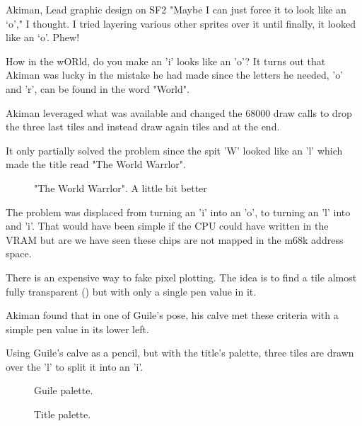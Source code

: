 \begin{q}{Akiman, Lead graphic design on SF2}
"Maybe I can just force it to look like an ‘o’," I thought. I tried layering various other sprites over it until finally, it looked like an ‘o’. Phew!
\end{q}

How in the wORld, do you make an 'i' looks like an 'o'? It turns out that Akiman was lucky in the mistake he had made since the letters he needed, 'o' and 'r', can be found in the word "World".

Akiman leveraged what was available and changed the 68000 draw calls to drop the three last tiles and instead draw again tiles  and  at the end.

It only partially solved the problem since the spit 'W' looked like an 'l' which made the title read "The World Warrlor". 

\begin{figure}[H]
 \caption*{"The World Warrlor". A little bit better}%
 \end{figure}%


The problem was displaced from turning an 'i' into an 'o', to turning an 'l' into and 'i'. That would have been simple if the CPU could have written in the VRAM but are we have seen these chips are not mapped in the m68k address space.

There is an expensive way to fake pixel plotting. The idea is to find a tile almost fully transparent () but with only a single pen value in it. 

Akiman found that in one of Guile's pose, his calve met these criteria with a simple pen value in its lower left.



\pagebreak

Using Guile's calve as a pencil, but with the title's palette, three tiles are drawn over the 'l' to split it into an 'i'.

\begin{figure}[H]
 \caption*{Guile palette.}%
 \end{figure}%

 \begin{figure}[H]
 \caption*{Title palette.}%
 \end{figure}%



